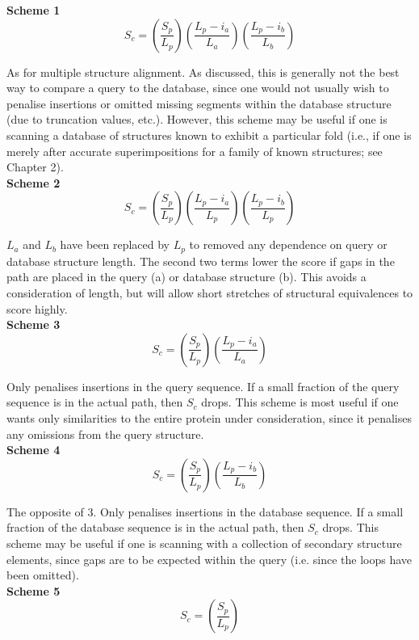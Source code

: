 {\bf Scheme 1}\\
\[
S_{c} =
\left(
\frac{S_{p}}{L_{p}}
\right)
\left(
\frac{L_{p}-i_{a}}{L_{a}}
\right)
\left(
\frac{L_{p}-i_{b}}{L_{b}}
\right)
\]

As for multiple structure alignment.   As discussed, this is generally not the 
best way to compare a 
query to the database, since one would not usually wish to penalise insertions
or omitted missing segments within the database structure (due to truncation values,
etc.).  However, this scheme may be useful if one is scanning a database of
structures known to exhibit a particular fold (i.e., if one is merely after 
accurate superimpositions for a family of known structures; see Chapter 2).\\

{\bf Scheme 2}\\
\[
S_{c} =
\left(
\frac{S_{p}}{L_{p}}
\right)
\left(
\frac{L_{p}-i_{a}}{L_{p}}
\right)
\left(
\frac{L_{p}-i_{b}}{L_{p}}
\right)
\]

$L_{a}$ and $L_{b}$ have been replaced by $L_{p}$ to removed any dependence
on query or database structure length.  The second two terms
lower the score if gaps in the path are placed in the query (a) or 
database structure (b).  This avoids a consideration of length, but will
allow short stretches of structural equivalences to score highly.\\

{\bf Scheme 3}
\[
S_{c} =
\left(
\frac{S_{p}}{L_{p}}
\right)
\left(
\frac{L_{p}-i_{a}}{L_{a}}
\right)
\]


Only penalises insertions in the query sequence.  If a small
fraction of the query sequence is in the actual path, then
$S_{c}$ drops.  
This scheme is most useful if one wants only similarities
to the entire protein under consideration, since it penalises
any omissions from the query structure.\\

{\bf Scheme 4}
\[
S_{c} =
\left(
\frac{S_{p}}{L_{p}}
\right)
\left(
\frac{L_{p}-i_{b}}{L_{b}}
\right)
\]

The opposite of 3.  Only penalises insertions in the database sequence.  
If a small fraction of the database sequence is in the actual path, then $S_{c}$ 
drops.  This scheme may be useful if one is scanning with a collection of
secondary structure elements, since gaps are to be expected within the 
query (i.e. since the loops have been omitted).\\


{\bf Scheme 5}
\[
S_{c} =
\left(
\frac{S_{p}}{L_{p}}
\right)
\]

